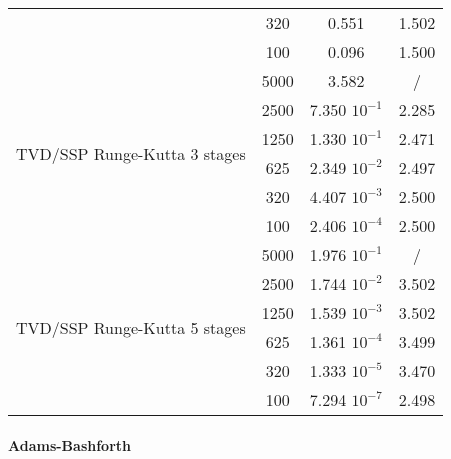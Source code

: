 \documentclass[pdftex,preprint,3p,times,numbers]{elsarticle}
\begin{document}
\begin{table}[!ht]
{\begin{tabular}{cccc}
                                             & 320             & 0.551           & 1.502                            \\
                                             & 100             & 0.096           & 1.500                            \\
    \cmidrule{2-4}
    \multirow{6}{*}{TVD/SSP Runge-Kutta 3 stages}
                                             & 5000            & 3.582           & /                                \\
                                             & 2500            & 7.350 $10^{-1}$ & 2.285                            \\
                                             & 1250            & 1.330 $10^{-1}$ & 2.471                            \\
                                             & 625             & 2.349 $10^{-2}$ & 2.497                            \\
                                             & 320             & 4.407 $10^{-3}$ & 2.500                            \\
                                             & 100             & 2.406 $10^{-4}$ & 2.500                            \\
    \cmidrule{2-4}
    \multirow{6}{*}{TVD/SSP Runge-Kutta 5 stages}
                                             & 5000            & 1.976 $10^{-1}$ & /                                \\
                                             & 2500            & 1.744 $10^{-2}$ & 3.502                            \\
                                             & 1250            & 1.539 $10^{-3}$ & 3.502                            \\
                                             & 625             & 1.361 $10^{-4}$ & 3.499                            \\
                                             & 320             & 1.333 $10^{-5}$ & 3.470                            \\
                                             & 100             & 7.294 $10^{-7}$ & 2.498                            \\
    \bottomrule
  \end{tabular}}
\end{table}

\paragraph{Adams-Bashforth}
\end{document}
